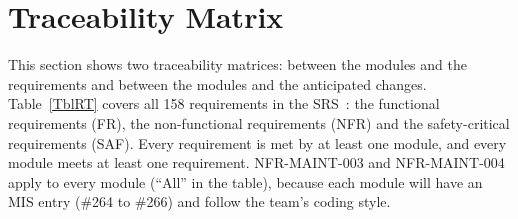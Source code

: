 \documentclass[12pt, titlepage]{article}
\begin{document}
\section{Traceability Matrix} \label{SecTM}

This section shows two traceability matrices: between the modules and the
requirements and between the modules and the anticipated changes.
Table~\ref{TblRT} covers all 158 requirements in the SRS~\citep{SRS}: the
functional requirements (FR), the non-functional requirements (NFR) and the
safety-critical requirements (SAF). Every requirement is met by at least one
module, and every module meets at least one requirement. NFR-MAINT-003 and
NFR-MAINT-004 apply to every module (``All'' in the table), because each module
will have an MIS entry (\#264 to \#266) and follow the team's coding style.
\end{document}
